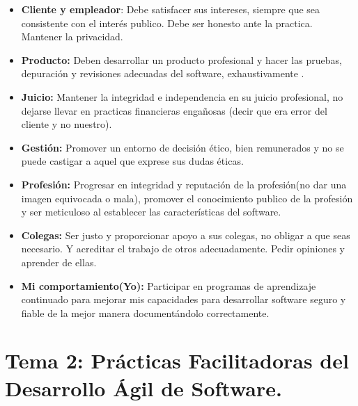 \documentclass[12pt, twoside, openright]{report} %
\begin{document}
\begin{itemize}
\begin{itemize}
\begin{itemize}
    \item \textbf{Cliente y empleador}: Debe satisfacer sus intereses,
      siempre que sea consistente con el interés publico. Debe ser
      honesto ante la practica. Mantener la privacidad.
      
    \item \textbf{Producto:} Deben desarrollar un producto profesional y
      hacer las pruebas, depuración y revisiones adecuadas del software,
      exhaustivamente .
      
    \item \textbf{Juicio:} Mantener la integridad e independencia en su
      juicio profesional, no dejarse llevar en practicas financieras
      engañosas (decir que era error del cliente y no nuestro).
      
    \item \textbf{Gestión:} Promover un entorno de decisión ético, bien
      remunerados y no se puede castigar a aquel que exprese sus dudas
      éticas.
      
    \item \textbf{Profesión:} Progresar en integridad y reputación de la
      profesión(no dar una imagen equivocada o mala), promover el
      conocimiento publico de la profesión y ser meticuloso al
      establecer las características del software.
      
    \item \textbf{Colegas:} Ser justo y proporcionar apoyo a sus colegas, no
      obligar a que seas necesario. Y acreditar el trabajo de otros
      adecuadamente. Pedir opiniones y aprender de ellas.
      
    \item \textbf{Mi comportamiento(Yo):} Participar en programas de
      aprendizaje continuado para mejorar mis capacidades para
      desarrollar software seguro y fiable de la mejor manera
      documentándolo correctamente.
      
    \end{itemize}
  \end{itemize}
\end{itemize}
\chapter{Tema 2: Prácticas Facilitadoras del Desarrollo Ágil de
Software.}
\end{document}
